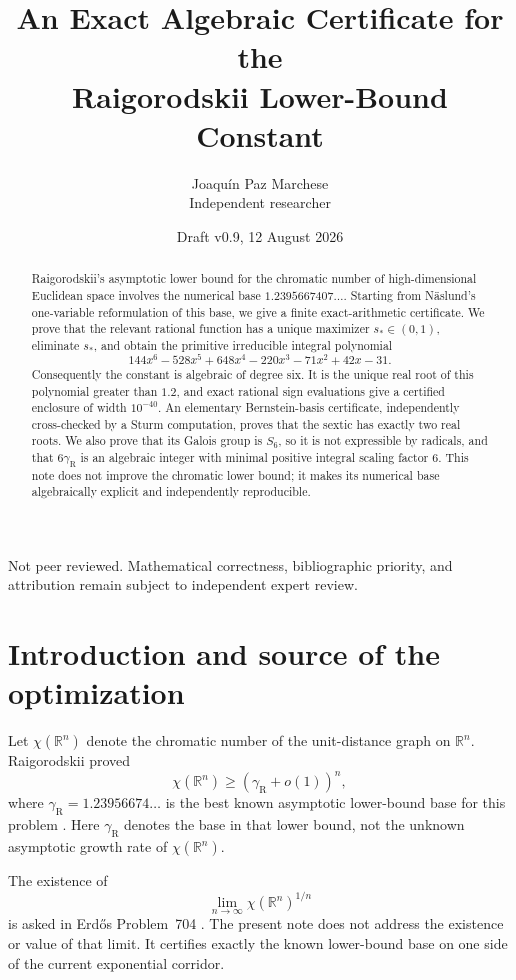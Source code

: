 \documentclass[11pt]{article}
\title{An Exact Algebraic Certificate for the\\Raigorodskii Lower-Bound Constant}
\author{Joaqu\'in Paz Marchese\\[2pt]\small Independent researcher}
\date{Draft v0.9, 12 August 2026}
\theoremstyle{remark}
\newcommand{\gR}{\gamma_{\mathrm R}}
\begin{document}
\maketitle

\begin{center}
\small\color{gray}
Not peer reviewed. Mathematical correctness, bibliographic priority, and attribution remain subject to independent expert review.
\end{center}

\begin{abstract}
Raigorodskii's asymptotic lower bound for the chromatic number of high-dimensional Euclidean space involves the numerical base
\(1.2395667407\ldots\). Starting from N\"aslund's one-variable reformulation of this base, we give a finite exact-arithmetic certificate. We prove that the relevant rational function has a unique maximizer \(s_*\in(0,1)\), eliminate \(s_*\), and obtain the primitive irreducible integral polynomial
\[
144x^6-528x^5+648x^4-220x^3-71x^2+42x-31.
\]
Consequently the constant is algebraic of degree six. It is the unique real root of this polynomial greater than \(1.2\), and exact rational sign evaluations give a certified enclosure of width \(10^{-40}\). An elementary Bernstein-basis certificate, independently cross-checked by a Sturm computation, proves that the sextic has exactly two real roots. We also prove that its Galois group is \(S_6\), so it is not expressible by radicals, and that \(6\gamma_{\mathrm R}\) is an algebraic integer with minimal positive integral scaling factor \(6\). This note does not improve the chromatic lower bound; it makes its numerical base algebraically explicit and independently reproducible.
\end{abstract}

\section{Introduction and source of the optimization}
Let \(\chi(\mathbb R^n)\) denote the chromatic number of the unit-distance graph on \(\mathbb R^n\). Raigorodskii proved
\[
\chi(\mathbb R^n)\geq (\gR+o(1))^n,
\]
where \(\gR=1.23956674\ldots\) is the best known asymptotic lower-bound base for this problem \cite{Raigorodskii2000,GorskayaEtAl2009,Naslund2023,Erdos704}. Here \(\gR\) denotes the base in that lower bound, not the unknown asymptotic growth rate of \(\chi(\mathbb R^n)\).

The existence of
\[
\lim_{n\to\infty}\chi(\mathbb R^n)^{1/n}
\]
is asked in Erd\H{o}s Problem~704 \cite{Erdos704}. The present note does not address the existence or value of that limit. It certifies exactly the known lower-bound base on one side of the current exponential corridor.
\end{document}
